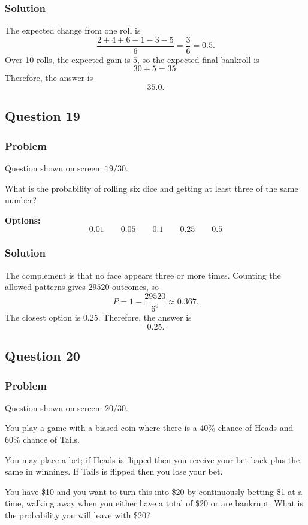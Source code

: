 \documentclass[12pt]{article}
\begin{document}
\subsubsection{Solution}
The expected change from one roll is
\[
\frac{2+4+6-1-3-5}{6}=\frac{3}{6}=0.5.
\]
Over 10 rolls, the expected gain is \(5\), so the expected final bankroll is
\[
30+5=35.
\]
Therefore, the answer is
\[
\boxed{35.0}.
\]

\subsection{Question 19}
\subsubsection{Problem}
Question shown on screen: \(19/30\).

What is the probability of rolling six dice and getting at least three of the same number?

\noindent\textbf{Options:}
\[
\boxed{0.01}
\qquad
\boxed{0.05}
\qquad
\boxed{0.1}
\qquad
\boxed{0.25}
\qquad
\boxed{0.5}
\]

\subsubsection{Solution}
The complement is that no face appears three or more times. Counting the allowed patterns gives \(29520\) outcomes, so
\[
P=1-\frac{29520}{6^6}\approx 0.367.
\]
The closest option is \(0.25\). Therefore, the answer is
\[
\boxed{0.25}.
\]

\subsection{Question 20}
\subsubsection{Problem}
Question shown on screen: \(20/30\).

You play a game with a biased coin where there is a 40\% chance of Heads and 60\% chance of Tails.

You may place a bet; if Heads is flipped then you receive your bet back plus the same in winnings. If Tails is flipped then you lose your bet.

You have \$10 and you want to turn this into \$20 by continuously betting \$1 at a time, walking away when you either have a total of \$20 or are bankrupt. What is the probability you will leave with \$20?
\end{document}
